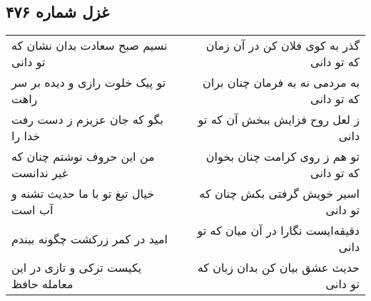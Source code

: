 \begin{center}
\section*{غزل شماره ۴۷۶}
\label{sec:sh476}
\begin{longtable}{l p{0.5cm} r}
نسیم صبح سعادت بدان نشان که تو دانی
&&
گذر به کوی فلان کن در آن زمان که تو دانی
\\
تو پیک خلوت رازی و دیده بر سر راهت
&&
به مردمی نه به فرمان چنان بران که تو دانی
\\
بگو که جان عزیزم ز دست رفت خدا را
&&
ز لعل روح فزایش ببخش آن که تو دانی
\\
من این حروف نوشتم چنان که غیر ندانست
&&
تو هم ز روی کرامت چنان بخوان که تو دانی
\\
خیال تیغ تو با ما حدیث تشنه و آب است
&&
اسیر خویش گرفتی بکش چنان که تو دانی
\\
امید در کمر زرکشت چگونه ببندم
&&
دقیقه‌ایست نگارا در آن میان که تو دانی
\\
یکیست ترکی و تازی در این معامله حافظ
&&
حدیث عشق بیان کن بدان زبان که تو دانی
\\
\end{longtable}
\end{center}
